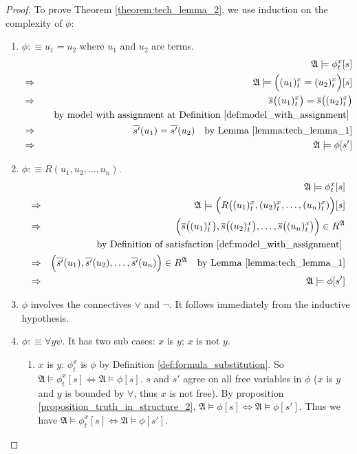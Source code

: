 \documentclass[11pt,letterpaper]{book}
\theoremstyle{definition}
\begin{document}
\begin{proof}

To prove Theorem \ref{theorem:tech_lemma_2}, we use induction on the
complexity of $\phi$:
\begin{enumerate}
\item{$\phi:\equiv u_1 = u_2$ where $u_1$ and $u_2$ are terms.
\begin{eqnarray*}
& & \mathfrak{A} \models \phi_t ^x [s] \\
& \Rightarrow & \mathfrak{A} \models \Big( (u_1)_t ^x = (u_2)_t ^x
\Big)[s] \\
& \Rightarrow & \overline{s}\big( (u_1)_t ^x \big) = \overline{s}\big(
(u_2)_t ^x \big) \\
& & \quad \text{by model with assignment at Definition
\ref{def:model_with_assignment} } \\
& \Rightarrow & \overline{s'} (u_1) = \overline{s'} (u_2) \quad \text{by
Lemma \ref{lemma:tech_lemma_1}} \\
& \Rightarrow & \mathfrak{A} \models \phi[s']
\end{eqnarray*}
}
\item{$\phi: \equiv R(u_1, u_2, \ldots, u_n)$.
\begin{eqnarray*}
& & \mathfrak{A} \models \phi_t ^x [s] \\
& \Rightarrow &\mathfrak{A} \models \Big( R\big((u_1)_t ^x, (u_2)_t ^x,
\ldots, (u_n)_t ^x ) \Big) [s] \\
& \Rightarrow & \Big( \overline{s}\big( (u_1)_t ^x \big),
\overline{s}\big( (u_2)_t ^x \big),  \ldots, \overline{s}\big( (u_n)_t
^x \big) \Big) \in R^{\mathfrak{A}} \\
& & \quad \text{by Definition of
satisfaction \ref{def:model_with_assignment} } \\
& \Rightarrow & \Big( \overline{s'}(u_1), \overline{s'}(u_2),  \ldots,
\overline{s'}(u_n) \Big) \in R^{\mathfrak{A}} \quad \text{by Lemma
\ref{lemma:tech_lemma_1}} \\
& \Rightarrow & \mathfrak{A} \models \phi[s']
\end{eqnarray*}
}
\item{$\phi$ involves the connectives $\lor$ and $\lnot$. It follows
immediately from the inductive hypothesis.
}
\item{$\phi: \equiv \forall y \psi$. It has two sub cases: $x$ is $y$;
$x$ is not $y$.}
\begin{enumerate}
\item{$x$ is $y$: $\phi_t ^x $ is $\phi $ by Definition 
\ref{def:formula_substitution}. So $\mathfrak{A} \models
\phi_t ^x [s] \iff \mathfrak{A} \models \phi[s] $. $s$ and $s'$ agree on
all free variables in $\phi$ ($x$ is $y$ and $y$ is bounded by $\forall
$, thus $x$ is not free). By proposition
\ref{proposition_truth_in_structure_2}, $\mathfrak{A}
\models \phi[s] \iff \mathfrak{A} \models \phi[s']$. Thus we have
$\mathfrak{A} \models \phi_t ^x [s] \iff \mathfrak{A} \models \phi[s'] $.
}


\end{enumerate}
\end{enumerate}
\end{proof}
\end{document}

